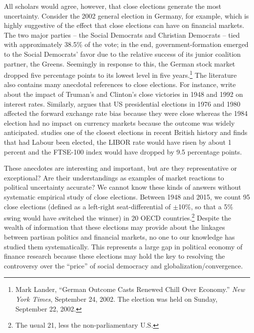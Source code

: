 \documentclass[12pt]{article}
\begin{document}
All scholars would agree, however, that close elections generate the most uncertainty. Consider the 2002 general election in Germany, for example, which is highly suggestive of the effect that close elections can have on financial markets. The two major parties  -- the Social Democrats and Christian Democrats -- tied with approximately 38.5\% of the vote; in the end, government-formation emerged to the Social Democrats' favor due to the relative success of its junior coalition partner, the Greens. Seemingly in response to this, the German stock market dropped five percentage points to its lowest level in five years.\footnote{Mark Lander, ``German Outcome Casts Renewed Chill Over Economy.'' \textit{New York Times}, September 24, 2002. The election was held on Sunday, September 22, 2002.}  The literature also contains many anecdotal references to close elections. For instance, \citet{Alesina1997} write about the impact of Truman's and Clinton's close victories in 1948 and 1992 on interest rates. Similarly, \citet{Bachman1992} argues that US presidential elections in 1976 and 1980 affected the forward exchange rate bias because they were close whereas the 1984 election had no impact on currency markets because the outcome was widely anticipated. \citet{Herron2000} studies one of the closest elections in recent British history and finds that had Labour been elected, the LIBOR rate would have risen by about 1 percent and the FTSE-100 index would have dropped by 9.5 percentage points. 

These anecdotes are interesting and important, but are they representative or exceptional? Are their understandings as examples of market reactions to political uncertainty accurate? We cannot know these kinds of answers without systematic empirical study of close elections. Between 1948 and 2015, we count 95 close elections (defined as a left-right seat-differential of $\pm$10\%, so that a 5\% swing would have switched the winner) in 20 OECD countries.\footnote{The usual 21, less the non-parliamentary U.S.} Despite the wealth of information that these elections may provide about the linkages between partisan politics and financial markets, no one to our knowledge has studied them systematically. This represents a large gap in political economy of finance research because these elections may hold the key to resolving the controversy over the ``price'' of social democracy and globalization/convergence. 
\end{document}
